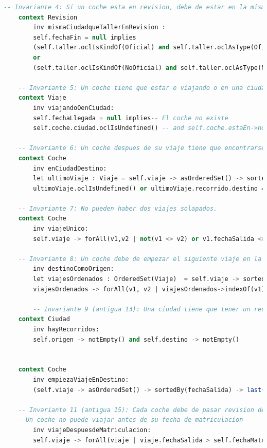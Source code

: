 \documentclass[12pt.a4paper]{article}
\begin{document}
\begin{lstlisting}[style = useNormal,language=SQL, caption={Codigo Use del apartado B}]
    -- Invariante 4: Si un coche esta en revision, debe de estar en la misma ciudad que el taller.
    context Revision
        inv mismaCiudadqueTallerEnRevision :
        self.fechaFin = null implies 
        (self.taller.oclIsKindOf(Oficial) and self.taller.oclAsType(Oficial).ciudad = self.coche.ciudad)
        or
        (self.taller.oclIsKindOf(NoOficial) and self.taller.oclAsType(NoOficial).ciudad = self.coche.ciudad)

    -- Invariante 5: Un coche tiene que estar o viajando o en una ciudad.
    context Viaje
        inv viajandoOenCiudad:
        self.fechaLlegada = null implies-- El coche no existe
        self.coche.ciudad.oclIsUndefined() -- and self.coche.estaEn->notEmpty() -- El coche existe en una ubicacion valida

    -- Invariante 6: Un coche despues de su viaje tiene que encontrarse en su ciudad destino.
    context Coche
        inv enCiudadDestino:
        let ultimoViaje : Viaje = self.viaje -> asOrderedSet() -> sortedBy(fechaLlegada) -> last() in
        ultimoViaje.oclIsUndefined() or ultimoViaje.recorrido.destino = self.ciudad
        
    -- Invariante 7: No pueden haber dos viajes solapados.
    context Coche
        inv viajeUnico:
        self.viaje -> forAll(v1,v2 | not(v1 <> v2) or v1.fechaSalida <> v2.fechaSalida and (v1.fechaLlegada <= v2.fechaSalida or v2.fechaLlegada <= v1.fechaSalida) and (not(v1.fechaLlegada = null and v2.fechaLlegada = null)))
    
    -- Invariante 8: Un coche debe de empezar el siguiente viaje en la ciudad destino del anterior.
        inv destinoComoOrigen:
        let viajesOrdenados : OrderedSet(Viaje)  = self.viaje -> sortedBy(v | v.fechaSalida) in 
        viajesOrdenados -> forAll(v1, v2 | viajesOrdenados->indexOf(v1) = viajesOrdenados->indexOf(v2) + 1 implies v1.recorrido.destino = v2.recorrido.origen)
            
        -- Invariante 9 (antigua 13): Una ciudad tiene que tener un recorrido con otra ciudad de manera obligatoria
    context Ciudad
        inv hayRecorridos:
        self.origen -> notEmpty() and self.destino -> notEmpty()
    

    context Coche
        inv empiezaViajeEnDestino:
        (self.viaje -> asOrderedSet() -> sortedBy(fechaSalida) -> last()).recorrido.destino = self.ciudad
    
    -- Invariante 11 (antigua 15): Cada coche debe de pasar revision despues de matricularse y no antes.
    --Un coche no puede viajar antes de su fecha de matriculacion
        inv viajeDespuesdeMatriculacion:
        self.viaje -> forAll(viaje | viaje.fechaSalida > self.fechaMatriculacion)    
    

\end{lstlisting}
\end{document}

